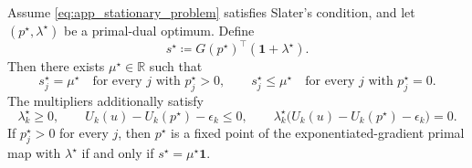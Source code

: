 \begin{theorem}
\label{thm:app_matching}
Assume \eqref{eq:app_stationary_problem} satisfies Slater's condition, and let $(p^\star,\lambda^\star)$ be a primal-dual optimum. Define
\begin{equation}
    s^\star
    \coloneqq
    G(p^\star)^\top(\mathbf{1}+\lambda^\star).
    \label{eq:app_stationary_score}
\end{equation}
Then there exists $\mu^\star\in\mathbb{R}$ such that
\begin{equation}
    s_j^\star=\mu^\star
    \quad\text{for every }j\text{ with }p_j^\star>0,
    \qquad
    s_j^\star\le\mu^\star
    \quad\text{for every }j\text{ with }p_j^\star=0.
    \label{eq:app_matching_condition}
\end{equation}
The multipliers additionally satisfy
\begin{equation}
    \lambda_k^\star\ge0,
    \qquad
    U_k(u)-U_k(p^\star)-\epsilon_k\le0,
    \qquad
    \lambda_k^\star\bigl(U_k(u)-U_k(p^\star)-\epsilon_k\bigr)=0.
    \label{eq:app_complementarity}
\end{equation}
If $p_j^\star>0$ for every $j$, then $p^\star$ is a fixed point of the exponentiated-gradient primal map with $\lambda^\star$ if and only if $s^\star=\mu^\star\mathbf{1}$.
\end{theorem}

